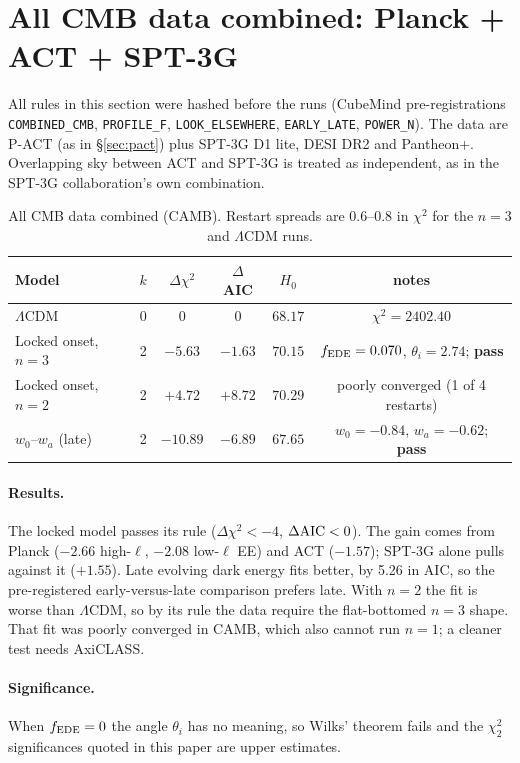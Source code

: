 \documentclass[11pt]{article}
\begin{document}
\section{All CMB data combined: Planck + ACT + SPT-3G}\label{sec:combined}
All rules in this section were hashed before the runs (CubeMind pre-registrations
\texttt{COMBINED\_CMB}, \texttt{PROFILE\_F}, \texttt{LOOK\_ELSEWHERE}, \texttt{EARLY\_LATE}, \texttt{POWER\_N}).
The data are P-ACT (as in \S\ref{sec:pact}) plus SPT-3G D1 lite, DESI DR2 and Pantheon+. Overlapping sky
between ACT and SPT-3G is treated as independent, as in the SPT-3G collaboration's own combination.

\begin{table}[h]
\centering
\small
\begin{tabular}{lccccc}
\toprule
Model & $k$ & $\Delta\chi^2$ & $\Delta$AIC & $H_0$ & notes\\
\midrule
$\Lambda$CDM & 0 & $0$ & $0$ & $68.17$ & $\chi^2=2402.40$\\
Locked onset, $n=3$ & 2 & $-5.63$ & $-1.63$ & $70.15$ & $f_{\rm EDE}=0.070$, $\theta_i=2.74$; \textbf{pass}\\
Locked onset, $n=2$ & 2 & $+4.72$ & $+8.72$ & $70.29$ & poorly converged (1 of 4 restarts)\\
$w_0$--$w_a$ (late) & 2 & $-10.89$ & $-6.89$ & $67.65$ & $w_0=-0.84$, $w_a=-0.62$; \textbf{pass}\\
\bottomrule
\end{tabular}
\caption{All CMB data combined (CAMB). Restart spreads are 0.6--0.8 in $\chi^2$ for the $n=3$ and
$\Lambda$CDM runs.}
\label{tab:combined}
\end{table}

\paragraph{Results.} The locked model passes its rule ($\Delta\chi^2<-4$, $\Delta{\rm AIC}<0$). The gain
comes from Planck ($-2.66$ high-$\ell$, $-2.08$ low-$\ell$ EE) and ACT ($-1.57$); SPT-3G alone pulls against it
($+1.55$). Late evolving dark energy fits better, by 5.26 in AIC, so the pre-registered early-versus-late
comparison prefers late. With $n=2$ the fit is worse than $\Lambda$CDM, so by its rule the data require the
flat-bottomed $n=3$ shape. That fit was poorly converged in CAMB, which also cannot run $n=1$; a cleaner test
needs AxiCLASS.

\paragraph{Significance.} When $f_{\rm EDE}=0$ the angle $\theta_i$ has no
meaning, so Wilks' theorem fails and the $\chi^2_2$ significances quoted in this paper are upper estimates.
\end{document}
